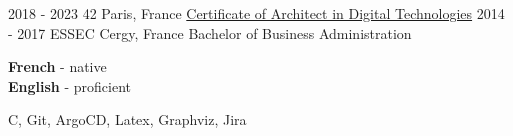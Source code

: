 \documentclass[10pt]{developercv} %
\begin{document}

\begin{entrylist}
	\entry
		{2018 - 2023}
		{42}
		{Paris, France}
		{\href{https://cv.42.fr/abarthel}{Certificate of Architect in Digital Technologies}}
	\entry
		{2014 - 2017}
		{ESSEC}
		{Cergy, France}
		{Bachelor of Business Administration}
\end{entrylist}


\begin{minipage}[t]{0.5\textwidth}
	\vspace{-\baselineskip} %


	\textbf{French} - native\\
	\textbf{English} - proficient
\end{minipage}
\hfill
\begin{minipage}[t]{0.5\textwidth}
	\vspace{-\baselineskip} %


	{C, Git, ArgoCD, Latex, Graphviz, Jira}

\end{minipage}

\end{document}
